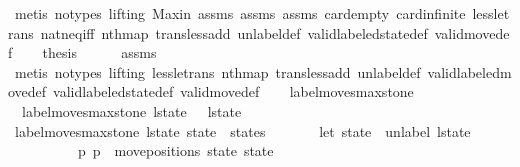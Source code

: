 \begin{isabellebody}
\ {\isacharparenleft}metis\ {\isacharparenleft}no{\isacharunderscore}types{\isacharcomma}\ lifting{\isacharparenright}\ Max{\isacharunderscore}in\ assms{\isacharparenleft}{}{\isacharparenright}\ assms{\isacharparenleft}{}{\isacharparenright}\ assms{\isacharparenleft}{}{\isacharparenright}\ card{\isacharunderscore}empty\ card{\isacharunderscore}infinite\ less{\isacharunderscore}le{\isacharunderscore}trans\ nat{\isacharunderscore}neq{\isacharunderscore}iff\ nth{\isacharunderscore}map\ trans{\isacharunderscore}less{\isacharunderscore}add{}\ unlabel{\isacharunderscore}def\ valid{\isacharunderscore}labeled{\isacharunderscore}state{\isacharunderscore}def\ valid{\isacharunderscore}move{\isacharprime}{\isacharunderscore}def{\isacharparenright}\isanewline
\ \ \isamarkupfalse%
\ {\isacharquery}thesis\isanewline
\ \ \ \ \isamarkupfalse%
\ assms\isanewline
\ \ \ \ \isamarkupfalse%
\ {\isacharparenleft}metis\ {\isacharparenleft}no{\isacharunderscore}types{\isacharcomma}\ lifting{\isacharparenright}\ less{\isacharunderscore}le{\isacharunderscore}trans\ nth{\isacharunderscore}map\ trans{\isacharunderscore}less{\isacharunderscore}add{}\ unlabel{\isacharunderscore}def\ valid{\isacharunderscore}labeled{\isacharunderscore}move{\isacharprime}{\isacharunderscore}def\ valid{\isacharunderscore}labeled{\isacharunderscore}state{\isacharunderscore}def\ valid{\isacharunderscore}move{\isacharprime}{\isacharunderscore}def{\isacharparenright}\isanewline
{}\isamarkupfalse%
%
\endisatagproof
{\isafoldproof}%
%
\isadelimproof
\ \ \isanewline
%
\endisadelimproof
\isanewline
{}\isamarkupfalse%
\ label{\isacharunderscore}moves{\isacharunderscore}max{\isacharunderscore}stone\ \isanewline
\ \ {\isachardoublequoteopen}label{\isacharunderscore}moves{\isacharunderscore}max{\isacharunderscore}stone\ l{\isacharunderscore}state\ {\isacharbrackleft}{\isacharbrackright}\ {\isacharequal}\ {\isacharbrackleft}l{\isacharunderscore}state{\isacharbrackright}{\isachardoublequoteclose}\isanewline
{\isacharbar}\ {\isachardoublequoteopen}label{\isacharunderscore}moves{\isacharunderscore}max{\isacharunderscore}stone\ l{\isacharunderscore}state\ {\isacharparenleft}state{\isacharprime}\ {\isacharhash}\ states{\isacharparenright}\ {\isacharequal}\ \isanewline
\ \ \ \ \ {\isacharparenleft}let\ state\ {\isacharequal}\ unlabel\ l{\isacharunderscore}state{\isacharsemicolon}\isanewline
\ \ \ \ \ \ \ \ \ \ {\isacharparenleft}p{}{\isacharcomma}\ p{}{\isacharparenright}\ {\isacharequal}\ move{\isacharunderscore}positions\ state\ state{\isacharprime}{\isacharsemicolon}\isanewline

\end{isabellebody}
